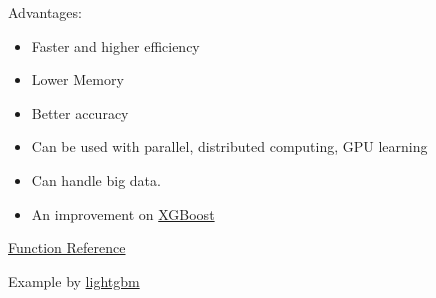 \documentclass[
]{book}
\newenvironment{Shaded}{\begin{snugshade}}{\end{snugshade}}
\newcommand{\AttributeTok}[1]{\textcolor[rgb]{0.77,0.63,0.00}{#1}}
\newcommand{\FunctionTok}[1]{\textcolor[rgb]{0.00,0.00,0.00}{#1}}
\newcommand{\NormalTok}[1]{#1}
\newcommand{\OtherTok}[1]{\textcolor[rgb]{0.56,0.35,0.01}{#1}}
\newcommand{\SpecialCharTok}[1]{\textcolor[rgb]{0.00,0.00,0.00}{#1}}
\newcommand{\StringTok}[1]{\textcolor[rgb]{0.31,0.60,0.02}{#1}}
\begin{document}
Advantages:

\begin{itemize}
\item
  Faster and higher efficiency
\item
  Lower Memory
\item
  Better accuracy
\item
  Can be used with parallel, distributed computing, GPU learning
\item
  Can handle big data.
\item
  An improvement on \protect\hyperlink{xgboost}{XGBoost}
\end{itemize}

\href{https://lightgbm.readthedocs.io/en/latest/R/reference/}{Function Reference}

Example by \href{https://lightgbm.readthedocs.io/en/latest/R/index.html}{lightgbm}

\begin{Shaded}
\end{Shaded}
\end{document}
